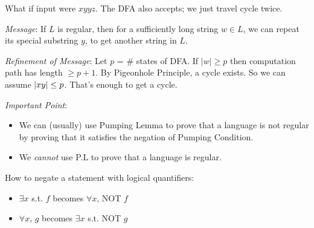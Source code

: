 What if input were $xyyz$. The DFA also accepts; we just travel cycle twice.

\emph{Message}: If $L$ is regular, then for a sufficiently long string $w \in L$, we can repeat its special substring $y$, to get another string in $L$.

\emph{Refinement of Message}: Let $p$ = \# states of DFA. If $|w| \geq p$ then computation path has length $\geq p + 1$. By Pigeonhole Principle, a cycle exists. So we can assume $\left | xy \right | \leq p$. That's enough to get a cycle.

\emph{Important Point}:

\begin{itemize}
  \item We can (usually) use Pumping Lemma to prove that a language is not regular by proving that it satisfies the negation of Pumping Condition.
  \item We \emph{cannot} use P.L to prove that a language is regular.
\end{itemize}

How to negate a statement with logical quantifiers:

\begin{itemize}
  \item $\exists x$ s.t. $f$ becomes $\forall x$, NOT $f$
  \item $\forall x$, $g$ becomes $\exists x$ s.t. NOT $g$
\end{itemize}

\backmatter
